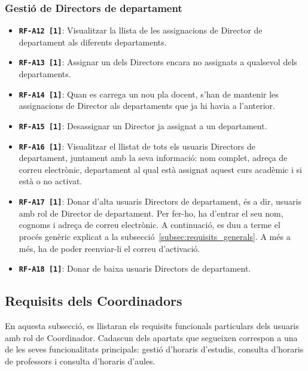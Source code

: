 \documentclass[a4paper,12pt]{ThesisStyle}
\begin{document}
\subsubsection{Gestió de Directors de departament}
\begin{itemize}
  \item \texttt{\textbf{RF-A12 [1]}}: Visualitzar la llista de les assignacions de Director de departament als diferents departaments.
  \item \texttt{\textbf{RF-A13 [1]}}: Assignar un dels Directors encara no assignats a qualsevol dels departaments.
  \item \texttt{\textbf{RF-A14 [1]}}: Quan es carrega un nou pla docent, s'han de mantenir les assignacions de Director als departaments que ja hi havia a l'anterior.
  \item \texttt{\textbf{RF-A15 [1]}}: Desassignar un Director ja assignat a un departament.
  \item \texttt{\textbf{RF-A16 [1]}}: Visualitzar el llistat de tots els usuaris Directors de departament, juntament amb la seva informació: nom complet, adreça de correu electrònic, departament al qual està assignat aquest curs acadèmic i si està o no activat.
  \item \texttt{\textbf{RF-A17 [1]}}: Donar d'alta usuaris Directors de departament, és a dir, usuaris amb rol de Director de departament. Per fer-ho, ha d'entrar el seu nom, cognoms i adreça de correu electrònic. A continuació, es duu a terme el procés genèric explicat a la subsecció~\ref{subsec:requisits_generals}. A més a més, ha de poder reenviar-li el correu d'activació.
  \item \texttt{\textbf{RF-A18 [1]}}: Donar de baixa usuaris Directors de departament.
\end{itemize}

\subsection{Requisits dels Coordinadors}
\label{subsec:requisits_coordinadors}

En aquesta subsecció, es llistaran els requisits funcionals particulars dels usuaris amb rol de Coordinador. Cadascun dels apartats que segueixen correspon a una de les seves funcionalitats principals: gestió d'horaris d'estudis, consulta d'horaris de professors i consulta d'horaris d'aules.
\end{document}
